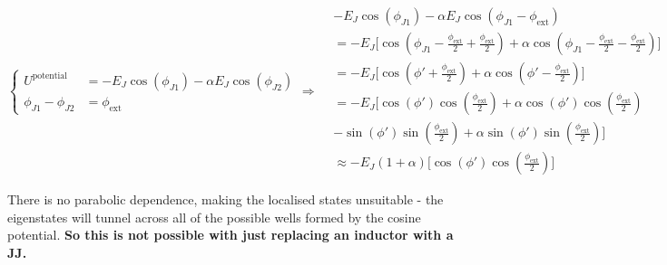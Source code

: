  \begin{equation}
   \left\lbrace\begin{aligned}
       U^{\text{potential}} & = -E_J\cos(\phi_{J1}) - \alpha E_J\cos(\phi_{J2})\\
       \phi_{J1} - \phi_{J2} & = \phi_\text{ext}
     \end{aligned}\right. \Rightarrow
   \begin{aligned}
     &-E_J\cos(\phi_{J1}) - \alpha E_J\cos(\phi_{J1}-\phi_\text{ext})\\
     & = -E_J\bigg[\cos(\phi_{J1}-\frac{\phi_\text{ext}}{2}+\frac{\phi_\text{ext}}{2}) + \alpha\cos(\phi_{J1}-\frac{\phi_\text{ext}}{2}-\frac{\phi_\text{ext}}{2})\bigg]\\
     & = -E_J\bigg[\cos(\phi'+\frac{\phi_\text{ext}}{2}) + \alpha\cos(\phi'-\frac{\phi_\text{ext}}{2})\bigg]\\
     & = -E_J\bigg[\cos(\phi')\cos(\frac{\phi_\text{ext}}{2}) + \alpha\cos(\phi')\cos(\frac{\phi_\text{ext}}{2})\\
     & - \sin(\phi')\sin(\frac{\phi_\text{ext}}{2}) + \alpha\sin(\phi')\sin(\frac{\phi_\text{ext}}{2}) \bigg]\\
     &                                                              \approx
     -E_J(1+\alpha)\bigg[\cos(\phi')\cos(\frac{\phi_\text{ext}}{2})\bigg]
   \end{aligned}
 \end{equation}

 \noindent  There is  no parabolic  dependence, making  the localised
 states unsuitable  - the eigenstates  will tunnel across all  of the
 possible wells  formed by the  cosine potential. \textbf{So  this is
   not possible with just replacing an inductor with a JJ.}

 \newpage
